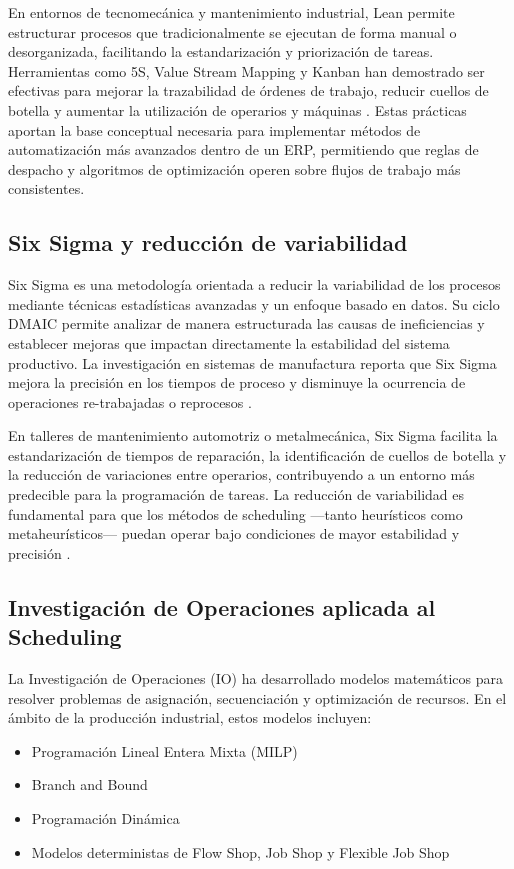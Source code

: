 En entornos de tecnomecánica y mantenimiento industrial, Lean permite estructurar procesos que tradicionalmente se ejecutan de forma manual o desorganizada, facilitando la estandarización y priorización de tareas. Herramientas como 5S, Value Stream Mapping y Kanban han demostrado ser efectivas para mejorar la trazabilidad de órdenes de trabajo, reducir cuellos de botella y aumentar la utilización de operarios y máquinas \cite{ref5}. Estas prácticas aportan la base conceptual necesaria para implementar métodos de automatización más avanzados dentro de un ERP, permitiendo que reglas de despacho y algoritmos de optimización operen sobre flujos de trabajo más consistentes.

\subsection{Six Sigma y reducción de variabilidad}

Six Sigma es una metodología orientada a reducir la variabilidad de los procesos mediante técnicas estadísticas avanzadas y un enfoque basado en datos. Su ciclo DMAIC permite analizar de manera estructurada las causas de ineficiencias y establecer mejoras que impactan directamente la estabilidad del sistema productivo. La investigación en sistemas de manufactura reporta que Six Sigma mejora la precisión en los tiempos de proceso y disminuye la ocurrencia de operaciones re-trabajadas o reprocesos \cite{flowshop}.

En talleres de mantenimiento automotriz o metalmecánica, Six Sigma facilita la estandarización de tiempos de reparación, la identificación de cuellos de botella y la reducción de variaciones entre operarios, contribuyendo a un entorno más predecible para la programación de tareas. La reducción de variabilidad es fundamental para que los métodos de scheduling —tanto heurísticos como metaheurísticos— puedan operar bajo condiciones de mayor estabilidad y precisión \cite{industry4,meisel2010}.

\subsection{Investigación de Operaciones aplicada al Scheduling}

La Investigación de Operaciones (IO) ha desarrollado modelos matemáticos para resolver problemas de asignación, secuenciación y optimización de recursos. En el ámbito de la producción industrial, estos modelos incluyen:
\begin{itemize}
    \item Programación Lineal Entera Mixta (MILP)
    \item Branch and Bound
    \item Programación Dinámica
    \item Modelos deterministas de Flow Shop, Job Shop y Flexible Job Shop
\end{itemize}

